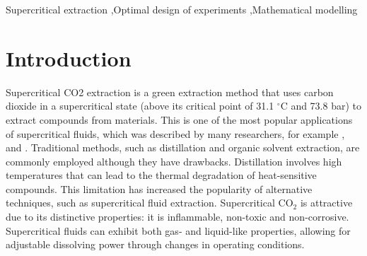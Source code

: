 \documentclass[a4paper,fleqn]{cas-dc}
\begin{document}
\begin{keywords}
	Supercritical extraction \sep Optimal design of experiments \sep Mathematical modelling
\end{keywords}

\maketitle


\section{Introduction}

%
Supercritical CO2 extraction is a green extraction method that uses carbon dioxide in a supercritical state (above its critical point of 31.1 $^\circ$C and 73.8 bar) to extract compounds from materials. This is one of the most popular applications of supercritical fluids, which was described by many researchers, for example \citet{Sodeifian2017}, \citet{Reverchon1993} and \citet{Sovova1994}. Traditional methods, such as distillation and organic solvent extraction, are commonly employed although they have drawbacks. Distillation involves high temperatures that can lead to the thermal degradation of heat-sensitive compounds. This limitation has increased the popularity of alternative techniques, such as supercritical fluid extraction. Supercritical CO$_2$ is attractive due to its distinctive properties: it is inflammable, non-toxic and non-corrosive. Supercritical fluids can exhibit both gas- and liquid-like properties, allowing for adjustable dissolving power through changes in operating conditions.
\end{document}

